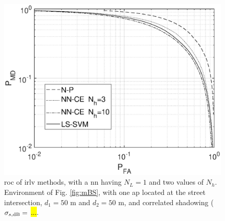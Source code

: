 \documentclass[draftcls,onecolumn,12pt]{IEEEtran}
\begin{document}
{%
\begin{figure}[t]
    \centering
    \includegraphics[width=0.6\columnwidth]{res_NP_approx_SVM.eps}
    \caption{\ac{roc} of \ac{irlv} methods, with a \ac{nn} having $N_L=1$ and two values of $N_h$. Environment of Fig. \ref{fig:mBS}, with one \ac{ap} located at the street intersection, $d_1 = 50$ m and $d_2 = 50$ m, and correlated shadowing ($\sigma_{s, {\rm dB}} = $ \hl{...}.}
    \label{fig:trueMap}
\end{figure}

}
\end{document}
